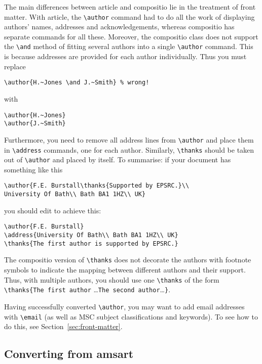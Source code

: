 \documentclass[noams]{compositio}
\newcommand*{\pkg}[1]{{\mdseries\textsf{#1}}}
\begin{document}
The main differences between \pkg{article} and \pkg{compositio} lie
in the treatment of front matter.  With \pkg{article}, the
\verb+\author+ command had to do all the work of displaying authors'
names, addresses and acknowledgements, whereas \pkg{compositio} has
separate commands for all these.  Moreover, the \pkg{compositio}
class does not support the \verb+\and+ method of fitting several
authors into a single \verb+\author+ command.  This is because
addresses are provided for each author individually.  Thus you must
replace
\begin{verbatim}
\author{H.~Jones \and J.~Smith} % wrong!
\end{verbatim}
with
\begin{verbatim}
\author{H.~Jones}
\author{J.~Smith}
\end{verbatim}
Furthermore, you need to remove all address lines from
\verb+\author+ and place them in \verb+\address+ commands, one for
each author. Similarly, \verb+\thanks+ should be taken out of
\verb+\author+ and placed by itself.  To summarise: if your
document has something like this
\begin{verbatim}
\author{F.E. Burstall\thanks{Supported by EPSRC.}\\
University Of Bath\\ Bath BA1 1HZ\\ UK}
\end{verbatim}
you should edit to achieve this:
\begin{verbatim}
\author{F.E. Burstall}
\address{University Of Bath\\ Bath BA1 1HZ\\ UK}
\thanks{The first author is supported by EPSRC.}
\end{verbatim}
The \pkg{compositio} version of \verb+\thanks+ does not decorate the
authors with footnote symbols to indicate the mapping between
different authors and their support.  Thus, with multiple authors,
you should use one \verb+\thanks+
of the form \verb+\thanks{The first author+%
\ldots\verb+The second author+\ldots\verb+}+.

Having successfully converted \verb+\author+, you may want to add
email addresses with \verb+\email+ (as well as MSC subject
classifications and keywords). To see how to do this, see
Section~\ref{sec:front-matter}.

\subsection{Converting from \pkg{amsart}}
\label{sec:conv-from-pkgams}
\end{document}
